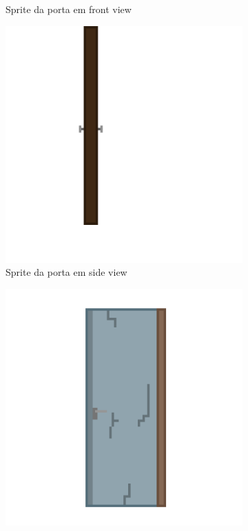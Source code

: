 \begin{figure}[htbp]
\begin{subfigure}{0.18\linewidth}
        \caption{\small Sprite da porta em front view}
        \label{fig:viduPortaA}
    \end{subfigure}
    \begin{subfigure}{0.18\linewidth}
        \centering
        \includegraphics[width=1\linewidth]{figs/vidu/referencia_porta (2).png}
        \caption{\small Sprite da porta em side view}
        \label{fig:viduPortaB}
    \end{subfigure}
    \begin{subfigure}{0.18\linewidth}
        \centering
        \includegraphics[width=1\linewidth]{figs/vidu/referencia_porta_tutorial (1).png}

\end{subfigure}
\end{figure}

